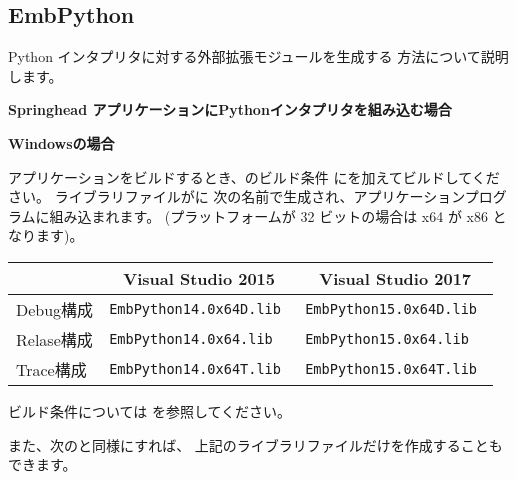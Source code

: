 \subsection{EmbPython}
\label{subsec:EmbPython}
\parindent=0pt

Python インタプリタに対する外部拡張モジュールを生成する 方法について説明します。

\medskip
\thinrule{\linewidth}

\noindent
\bf{Springhead アプリケーションにPythonインタプリタを組み込む場合}

\bigskip
\bf{Windowsの場合}
\begin{narrow}
	アプリケーションをビルドするとき、\QCMakeSettings{}のビルド条件
	にを加えてビルドしてください。
	ライブラリファイルがに
	次の名前で生成され、アプリケーションプログラムに組み込まれます。
 	(プラットフォームが 32 ビットの場合は x64 が x86 となります)。
	
	\medskip
	\begin{narrow}[20pt]
	\begin{tabular}{l@{\ \ ---\ \ }ll}\hline
	    & \multicolumn{1}{c}{Visual Studio 2015}
	    & \multicolumn{1}{c}{Visual Studio 2017} \\\hline
	    Debug構成 & \tt{EmbPython14.0x64D.lib} & \tt{EmbPython15.0x64D.lib} \\
	    Relase構成 & \tt{EmbPython14.0x64.lib} & \tt{EmbPython15.0x64.lib} \\
	    Trace構成 & \tt{EmbPython14.0x64T.lib} & \tt{EmbPython15.0x64T.lib} \\\hline
	\end{tabular}
	\end{narrow}

	\bigskip
	ビルド条件については
	を参照してください。

	また、次のと同様にすれば、
	上記のライブラリファイルだけを作成することもできます。
\end{narrow}

